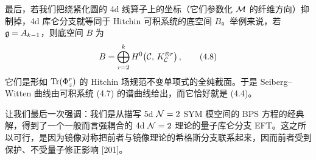 最后，若我们把绕紧化圆的 4d 线算子上的坐标（它们参数化 $\mathcal{M}$ 的纤维方向）抑制掉，4d 库仑分支就等同于 Hitchin 可积系统的底空间 $B$。举例来说，若 $\mathfrak{g}=A_{k-1}$，则底空间 $B$ 为
\begin{equation}
  B = \bigoplus_{r=2}^{k}H^0\!\left(\mathcal{C},\,K_{\mathcal{C}}^{\otimes r}\right),
  \tag{4.8}
\end{equation}
它们是形如 $\operatorname{Tr}(\Phi_z^r)$ 的 Hitchin 场规范不变单项式的全纯截面。于是 Seiberg--Witten 曲线由可积系统 (4.7) 的谱曲线给出，而它恰好就是 (4.4)。

让我们最后一次强调：我们是从描写 5d $\mathcal{N}=2$ SYM 模空间的 BPS 方程的经典解，得到了一个一般而言强耦合的 4d $\mathcal{N}=2$ 理论的量子库仑分支 EFT。这之所以可行，是因为镜像对称把前者与镜像理论的希格斯分支联系起来，因而前者受到保护、不受量子修正影响 [201]。


